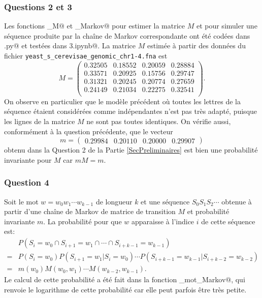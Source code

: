\documentclass[a4paper,12pt]{article}
\begin{document}
\subsubsection*{Questions 2 et 3}

Les fonctions \verb@estim_M@ et \verb@simule_Markov@ pour estimer la matrice $M$ et pour simuler une séquence produite par la chaîne de Markov correspondante ont été codées dans \verb@projet.py@ et testées dans \verb@Projet3.ipynb@. La matrice $M$ estimée à partir des données du fichier \texttt{yeast\_\allowbreak{}s\_\allowbreak{}cerevisae\_\allowbreak{}genomic\_\allowbreak{}chr1-4\allowbreak{}.fna} est
\[
M = 
\begin{pmatrix}
0.32505 & 0.18552 & 0.20059 & 0.28884 \\
0.33571 & 0.20925 & 0.15756 & 0.29747 \\
0.31321 & 0.20245 & 0.20774 & 0.27659 \\
0.24149 & 0.21034 & 0.22275 & 0.32541 \\
\end{pmatrix}.
\]
On observe en particulier que le modèle précédent où toutes les lettres de la séquence étaient considérées comme indépendantes n'est pas très adapté, puisque les lignes de la matrice $M$ ne sont pas toutes identiques. On vérifie aussi, conformément à la question précédente, que le vecteur
\[
m = 
\begin{pmatrix}
0.29984 & 0.20110 & 0.20000 & 0.29907
\end{pmatrix}
\]
obtenu dans la Question 2 de la Partie \ref{SecPreliminaires} est bien une probabilité invariante pour $M$ car $m M = m$.

\subsubsection*{Question 4}

Soit le mot $w = w_0 w_1 \dotsm w_{k-1}$ de longueur $k$ et une séquence $S_0 S_1 S_2 \dotsm$ obtenue à partir d'une chaîne de Markov de matrice de transition $M$ et probabilité invariante $m$. La probabilité pour que $w$ apparaisse à l'indice $i$ de cette séquence est:
\begin{align*}
 & P(S_i = w_0 \cap S_{i+1} = w_1 \cap \dotsb \cap S_{i+k-1} = w_{k-1}) \\
{} = {} & P(S_i = w_0) P(S_{i+1} = w_1 | S_i = w_0) \dotsm P(S_{i+k-1} = w_{k-1} | S_{i+k-2} = w_{k-2}) \\
{} = {} & m(w_0) M(w_0, w_1) \dotsm M(w_{k-2}, w_{k-1}).
\end{align*}
Le calcul de cette probabilité a été fait dans la fonction \verb@logproba_mot_Markov@, qui renvoie le logarithme de cette probabilité car elle peut parfois être très petite.
\end{document}
